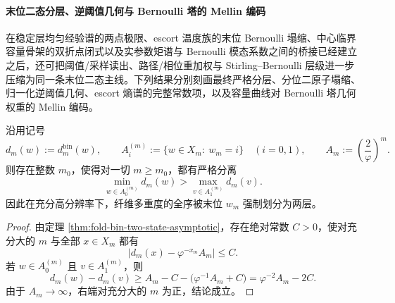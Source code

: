 \paragraph{末位二态分层、逆阈值几何与 Bernoulli 塔的 Mellin 编码}
在稳定层均匀经验谱的两点极限、escort 温度族的末位 Bernoulli 塌缩、中心临界容量骨架的双折点闭式以及实参数矩谱与 Bernoulli 模态系数之间的桥接已经建立之后，还可把阈值/采样读出、路径/相位重加权与 Stirling--Bernoulli 层级进一步压缩为同一条末位二态主线。下列结果分别刻画最终严格分层、分位二原子塌缩、归一化逆阈值几何、escort 熵谱的完整常数项，以及容量曲线对 Bernoulli 塔几何权重的 Mellin 编码。

\begin{theorem}[末位相位的最终严格分层]\label{thm:xi-time-part70ab-terminal-bit-eventual-strict-stratification}
沿用记号
\[
d_m(w):=d_m^{\mathrm{bin}}(w),\qquad
A_i^{(m)}:=\{w\in X_m:\ w_m=i\}\quad(i=0,1),
\qquad
A_m:=\left(\frac{2}{\varphi}\right)^m.
\]
则存在整数 \(m_0\)，使得对一切 \(m\ge m_0\)，都有严格分离
\[
\min_{w\in A_0^{(m)}} d_m(w)
>
\max_{v\in A_1^{(m)}} d_m(v).
\]
因此在充分高分辨率下，纤维多重度的全序被末位 \(w_m\) 强制划分为两层。
\end{theorem}
\begin{proof}
由定理 \ref{thm:fold-bin-two-state-asymptotic}，存在绝对常数 \(C>0\)，使对充分大的 \(m\) 与全部 \(x\in X_m\) 都有
\[
\bigl|d_m(x)-\varphi^{-x_m}A_m\bigr|\le C.
\]
若 \(w\in A_0^{(m)}\) 且 \(v\in A_1^{(m)}\)，则
\[
d_m(w)-d_m(v)
\ge
A_m-C-\bigl(\varphi^{-1}A_m+C\bigr)
=
\varphi^{-2}A_m-2C.
\]
由于 \(A_m\to\infty\)，右端对充分大的 \(m\) 为正，结论成立。
\end{proof}


